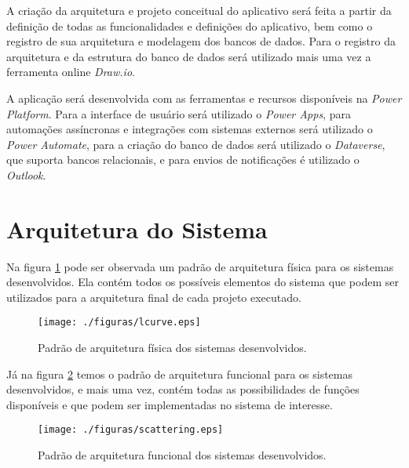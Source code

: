 	A criação da arquitetura e projeto conceitual do aplicativo será feita a partir da definição de todas as funcionalidades e definições do aplicativo, bem como o registro de sua arquitetura e modelagem dos bancos de dados. Para o registro da arquitetura e da estrutura do banco de dados será utilizado mais uma vez a ferramenta online \textit{Draw.io}.

	A aplicação será desenvolvida com as ferramentas e recursos disponíveis na \textit{Power Platform}. Para a interface de usuário será utilizado o \textit{Power Apps}, para automações assíncronas e integrações com sistemas externos será utilizado o \textit{Power Automate}, para a criação do banco de dados será utilizado o \textit{Dataverse}, que suporta bancos relacionais, e para envios de notificações é utilizado o \textit{Outlook}.

	\section{Arquitetura do Sistema}

	Na figura \ref{fig:metodologia:arquiteturaFisica} pode ser observada um padrão de arquitetura física para os sistemas desenvolvidos. Ela contém todos os possíveis
	elementos do sistema que podem ser utilizados para a arquitetura final de cada projeto executado. 
	\begin{figure}[h]
		\centering
		\texttt{[image: ./figuras/lcurve.eps]}
		\caption{Padrão de arquitetura física dos sistemas desenvolvidos.}
		\label{fig:metodologia:arquiteturaFisica}
	\end{figure}

	Já na figura \ref{fig:metodologia:arquiteturaFuncional} temos o padrão de arquitetura funcional para os sistemas desenvolvidos, e mais uma vez, contém todas as possibilidades
	de funções disponíveis e que podem ser implementadas no sistema de interesse.
	\begin{figure}[h]
		\centering
		\texttt{[image: ./figuras/scattering.eps]}
		\caption{Padrão de arquitetura funcional dos sistemas desenvolvidos.}
		\label{fig:metodologia:arquiteturaFuncional}
	\end{figure}